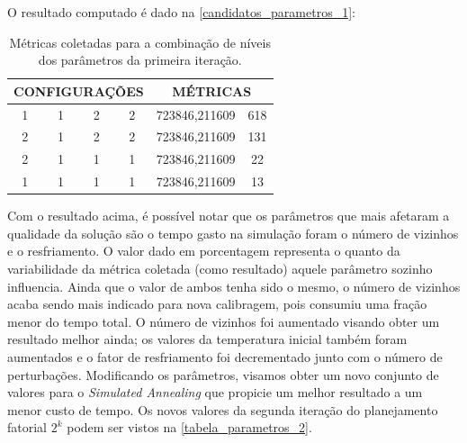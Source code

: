 \documentclass[
	12pt,				%
	twoside,			%
	a4paper,			%
	english,			%
	french,				%
	spanish,			%
	brazil				%
	]{abntex2}
\begin{document}
O resultado computado é dado na \autoref{candidatos_parametros_1}:

\begin{table}[ht]
\centering
\caption{Métricas coletadas para a combinação de níveis dos parâmetros da primeira iteração.}
\label{candidatos_parametros_1}
    \begin{tabular}{|c|c|c|c|c|c|}
        \hline
        \multicolumn{4}{|c|}{\textbf{CONFIGURAÇÕES}} & \multicolumn{2}{c|}{\textbf{MÉTRICAS}} \\ \hline
        1          & 1          & 2          & 2          & 723846,211609                   & 618                  \\ \hline
        2          & 1          & 2          & 2          & 723846,211609                   & 131                  \\ \hline
        2          & 1          & 1          & 1          & 723846,211609                   & 22                   \\ \hline
        1          & 1          & 1          & 1          & 723846,211609                   & 13                   \\ \hline
    \end{tabular}%

\end{table}

Com o resultado acima, é possível notar que os parâmetros que mais
afetaram a qualidade da solução são o tempo gasto na simulação foram o
número de vizinhos e o resfriamento. O valor dado em porcentagem
representa o quanto da variabilidade da métrica coletada (como
resultado) aquele parâmetro sozinho influencia. Ainda que o valor de
ambos tenha sido o mesmo, o número de vizinhos acaba sendo mais indicado
para nova calibragem, pois consumiu uma fração menor do tempo total. O
número de vizinhos foi aumentado visando obter um resultado melhor
ainda; os valores da temperatura inicial também foram aumentados e o
fator de resfriamento foi decrementado junto com o número de
perturbações. Modificando os parâmetros, visamos obter um novo conjunto
de valores para o \emph{Simulated Annealing} que propicie um melhor
resultado a um menor custo de tempo. Os novos valores da segunda
iteração do planejamento fatorial \(2^{k}\) podem ser vistos na
\autoref{tabela_parametros_2}.
\end{document}
